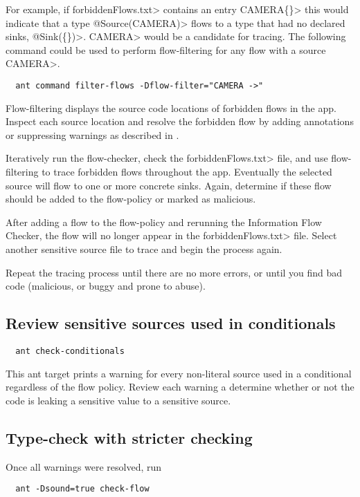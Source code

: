 For example, if \<forbiddenFlows.txt> contains an entry \<CAMERA\flowsto \{\}>
this would indicate that a type \<@Source(CAMERA)> flows to a type that had no declared sinks,
\<@Sink(\{\})>. \<CAMERA> would be a candidate for tracing. The following command
could be used to perform flow-filtering for any flow with a source \<CAMERA>.

\begin{Verbatim}
  ant command filter-flows -Dflow-filter="CAMERA ->"
\end{Verbatim}

Flow-filtering displays the source code locations of forbidden flows in the app.
Inspect each source location and resolve the forbidden flow by adding annotations
or suppressing warnings as described in .

Iteratively run the flow-checker, check the \<forbiddenFlows.txt> file, and use flow-filtering
to trace forbidden flows throughout the app.  Eventually the selected source will flow
to one or more concrete sinks. Again, determine if these flow should be added to the flow-policy
or marked as malicious.

After adding a flow to the flow-policy and rerunning the Information Flow Checker, the flow
will no longer appear in the \<forbiddenFlows.txt> file. Select another sensitive
source file to trace and begin the process again.

Repeat the tracing process until there are no more errors, or until you find bad code
(malicious, or buggy and prone to abuse).

\subsection{Review sensitive sources used in conditionals}
\begin{Verbatim}
  ant check-conditionals
\end{Verbatim}
This ant target prints a warning for every non-literal source used in a conditional regardless
of the flow policy.  Review each warning a determine whether or not the code is leaking a 
sensitive value to a sensitive source. 

\subsection{Type-check with stricter checking}

Once all warnings were resolved, run 

\begin{Verbatim}
  ant -Dsound=true check-flow
\end{Verbatim}

